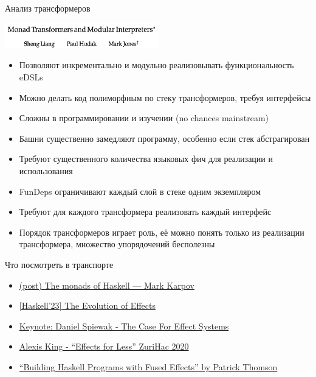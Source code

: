     \begin{frame}[fragile]{Анализ трансформеров}
        \begin{center}
            \includegraphics[width=0.5\textwidth]{figs/transformers}
        \end{center}
        \begin{itemize}
            \item[\positive] Позволяют инкрементально и модульно реализовывать функциональность eDSLs
            \item[\positive] Можно делать код полиморфным по стеку трансформеров, требуя интерфейсы
            \item[\negative] Сложны в программировании и изучении (no chances mainstream)
            \item[\negative] Башни существенно замедляют программу, особенно если стек абстрагирован
            \item[\negative] Требуют существенного количества языковых фич для реализации и использования
            \item[\negative] FunDeps ограничивают каждый слой в стеке одним экземпляром
            \item[\negative] Требуют для каждого трансформера реализовать каждый интерфейс
            \item[\negative] Порядок трансформеров играет роль, её можно понять только из реализации трансформера, множество упорядочений бесполезны
        \end{itemize}
    \end{frame}


    \begin{frame}[fragile]{Что посмотреть в транспорте}
        \begin{itemize}
            \item \href{https://markkarpov.com/post/the-monads}{\color{blue}(post) The monads of Haskell --- Mark Karpov}
            \item \href{https://youtu.be/m821Vz8N_bo?si=f-2cR0QExCWZr-BK}{\color{blue} [Haskell'23] The Evolution of Effects }
            \item \href{https://youtu.be/qgfCmQ-2tW0?si=6BjvijRPU2hEmk49}{\color{blue}  Keynote: Daniel Spiewak - The Case For Effect Systems }
            \item \href{https://www.youtube.com/live/0jI-AlWEwYI?si=KzgcHDgZ4GseytRA}{\color{blue} Alexis King - ``Effects for Less'' ZuriHac 2020}
            \item \href{https://youtu.be/vfDazZfxlNs?si=Sjfitsfe33jpbMth}{\color{blue}  ``Building Haskell Programs with Fused Effects'' by Patrick Thomson}
        \end{itemize}
    \end{frame}

